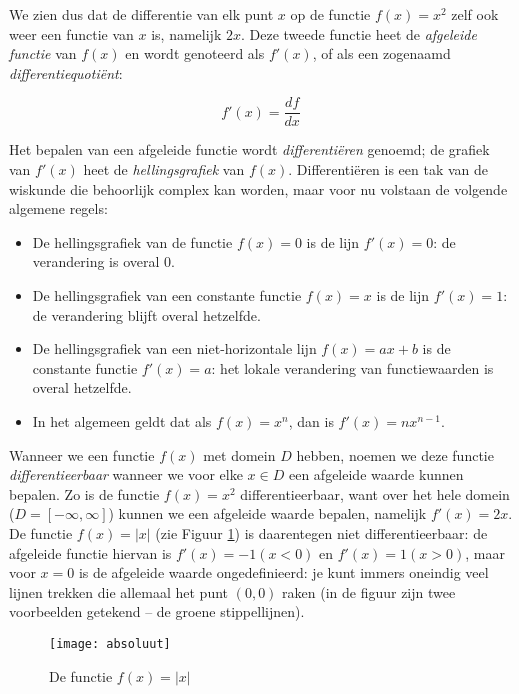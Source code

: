 We zien dus dat de differentie van elk punt $x$ op de functie $f(x) = x^2$ zelf ook weer een functie van $x$ is, namelijk $2x$. 
Deze tweede functie heet de \textit{afgeleide functie} van $f(x)$ en wordt genoteerd als $f'(x)$, of als een zogenaamd \textit{differentiequotiënt}:

\[
    f'(x) = \frac{df}{dx}
\]

Het bepalen van een afgeleide functie wordt \textit{differentiëren} genoemd; de grafiek van $f'(x)$ heet de \textit{hellingsgrafiek} van $f(x)$. Differentiëren is een tak van de wiskunde die behoorlijk complex kan worden, maar voor nu volstaan de volgende algemene regels:

\begin{itemize}
    \item De hellingsgrafiek van de functie $f(x)=0$ is de lijn $f'(x)=0$: de verandering is overal 0.
    \item De hellingsgrafiek van een constante functie $f(x)=x$ is de lijn $f'(x)=1$: de verandering blijft overal hetzelfde.
    \item De hellingsgrafiek van een niet-horizontale lijn $f(x) = ax + b$ is de constante functie $f'(x)=a$: het lokale verandering van functiewaarden is overal hetzelfde. 
    \item In het algemeen geldt dat als $f(x) = x^n$, dan is $f'(x) = nx^{n-1}$. 
\end{itemize}

Wanneer we een functie $f(x)$ met domein $D$ hebben, noemen we deze functie \textit{differentieerbaar} wanneer we voor elke $x \in D$ een afgeleide waarde kunnen bepalen. Zo is de functie $f(x) = x^2$ differentieerbaar, want over het hele domein ($D = \left[-\infty, \infty\right]$) kunnen we een afgeleide waarde bepalen, namelijk $f'(x)=2x$. De functie $f(x)=|x|$ (zie Figuur \ref{img:abs}) is daarentegen niet differentieerbaar: de afgeleide functie hiervan is $f'(x)=-1 (x<0)$ en $f'(x)=1 (x>0)$, maar voor $x=0$ is de afgeleide waarde ongedefinieerd: je kunt immers oneindig veel lijnen trekken die allemaal het punt $(0,0)$ raken (in de figuur zijn twee voorbeelden getekend – de groene stippellijnen).

\begin{figure}[h]
    \centering
    \texttt{[image: absoluut]}
    \caption{De functie $f(x) = |x|$\label{img:abs}}
\end{figure}
